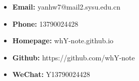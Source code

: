 \documentclass[]{awesome-cv}
\begin{document}
\vspace{-5mm}
{\color{text}

\begin{itemize}
	\item \textbf{Email:}  yanhw7@mail2.sysu.edu.cn
	\item \textbf{Phone:} 13790024428
	\item \textbf{Homepage:} whY-note.github.io
	\item \textbf{Github:} https://github.com/whY-note
	\item \textbf{WeChat:} Y13790024428
\end{itemize}
}
\end{document}
